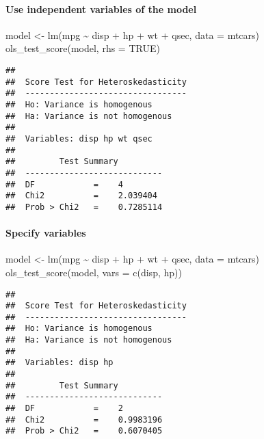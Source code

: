 \documentclass[
]{article}
\newenvironment{Shaded}{\begin{snugshade}}{\end{snugshade}}
\newcommand{\AttributeTok}[1]{\textcolor[rgb]{0.77,0.63,0.00}{#1}}
\newcommand{\ConstantTok}[1]{\textcolor[rgb]{0.00,0.00,0.00}{#1}}
\newcommand{\FunctionTok}[1]{\textcolor[rgb]{0.00,0.00,0.00}{#1}}
\newcommand{\NormalTok}[1]{#1}
\newcommand{\OtherTok}[1]{\textcolor[rgb]{0.56,0.35,0.01}{#1}}
\newcommand{\SpecialCharTok}[1]{\textcolor[rgb]{0.00,0.00,0.00}{#1}}
\newcommand{\StringTok}[1]{\textcolor[rgb]{0.31,0.60,0.02}{#1}}
\begin{document}
\hypertarget{use-independent-variables-of-the-model-1}{%
\paragraph{Use independent variables of the
model}\label{use-independent-variables-of-the-model-1}}

\begin{Shaded}
\begin{Highlighting}[]
\NormalTok{model }\OtherTok{\textless{}{-}} \FunctionTok{lm}\NormalTok{(mpg }\SpecialCharTok{\textasciitilde{}}\NormalTok{ disp }\SpecialCharTok{+}\NormalTok{ hp }\SpecialCharTok{+}\NormalTok{ wt }\SpecialCharTok{+}\NormalTok{ qsec, }\AttributeTok{data =}\NormalTok{ mtcars)}
\FunctionTok{ols\_test\_score}\NormalTok{(model, }\AttributeTok{rhs =} \ConstantTok{TRUE}\NormalTok{)}
\end{Highlighting}
\end{Shaded}

\begin{verbatim}
## 
##  Score Test for Heteroskedasticity
##  ---------------------------------
##  Ho: Variance is homogenous
##  Ha: Variance is not homogenous
## 
##  Variables: disp hp wt qsec 
## 
##         Test Summary         
##  ----------------------------
##  DF            =    4 
##  Chi2          =    2.039404 
##  Prob > Chi2   =    0.7285114
\end{verbatim}

\hypertarget{specify-variables}{%
\paragraph{Specify variables}\label{specify-variables}}

\begin{Shaded}
\begin{Highlighting}[]
\NormalTok{model }\OtherTok{\textless{}{-}} \FunctionTok{lm}\NormalTok{(mpg }\SpecialCharTok{\textasciitilde{}}\NormalTok{ disp }\SpecialCharTok{+}\NormalTok{ hp }\SpecialCharTok{+}\NormalTok{ wt }\SpecialCharTok{+}\NormalTok{ qsec, }\AttributeTok{data =}\NormalTok{ mtcars)}
\FunctionTok{ols\_test\_score}\NormalTok{(model, }\AttributeTok{vars =} \FunctionTok{c}\NormalTok{(}\StringTok{\textquotesingle{}disp\textquotesingle{}}\NormalTok{, }\StringTok{\textquotesingle{}hp\textquotesingle{}}\NormalTok{))}
\end{Highlighting}
\end{Shaded}

\begin{verbatim}
## 
##  Score Test for Heteroskedasticity
##  ---------------------------------
##  Ho: Variance is homogenous
##  Ha: Variance is not homogenous
## 
##  Variables: disp hp 
## 
##         Test Summary         
##  ----------------------------
##  DF            =    2 
##  Chi2          =    0.9983196 
##  Prob > Chi2   =    0.6070405
\end{verbatim}
\end{document}

